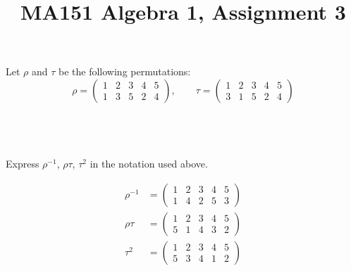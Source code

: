 \documentclass[a4paper]{article}
\title{MA151 Algebra 1, Assignment 3}
\begin{document}
\maketitle

\setlength{\parindent}{0em}
\setlength{\parskip}{1em}

\renewcommand{\thesubsection}{Q\arabic{section}~\roman{subsection}.}

\begin{questionbody}
Let $\rho$ and $\tau$ be the following permutations: \[
\rho = \begin{pmatrix}1 & 2 & 3 & 4 & 5\\ 1 & 3 & 5 & 2 & 4\end{pmatrix},
\qquad \tau = \begin{pmatrix}1 & 2 & 3 & 4 & 5\\ 3 & 1 & 5 & 2 & 4\end{pmatrix}
\]
\end{questionbody}

\subsection{~} %

\begin{questionbody}
Express $\rho^{−1}$, $\rho \tau$, $\tau^2$ in the notation used above.
\end{questionbody}

\begin{align*}
	\rho^{-1} &= \begin{pmatrix}1 & 2 & 3 & 4 & 5\\ 1 & 4 & 2 & 5 & 3\end{pmatrix}\\[1ex]
	\rho\tau  &= \begin{pmatrix}1 & 2 & 3 & 4 & 5\\ 5 & 1 & 4 & 3 & 2\end{pmatrix}\\[1ex]
	\tau^2    &= \begin{pmatrix}1 & 2 & 3 & 4 & 5\\ 5 & 3 & 4 & 1 & 2\end{pmatrix}\\[1ex]
\end{align*}

\subsection{~} %
\end{document}
